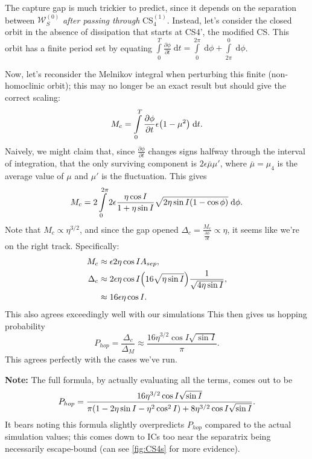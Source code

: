\documentclass[11pt,
        usenames, %
        dvipsnames %
    ]{article}
\newcommand*{\pd}[2]{\frac{\partial#1}{\partial#2}}
\DeclarePairedDelimiter\p{\lparen}{\rparen}
\begin{document}
The capture gap is much trickier to predict, since it depends on the separation
between $\mathcal{W}^{(0)}_S$ \emph{after passing through} CS$_4^{(1)}$.
Instead, let's consider the closed orbit in the absence of dissipation that
starts at CS4', the modified CS\@. This orbit has a finite period set by
equating $\int\limits_0^T \pd{\phi}{t}\;\mathrm{d}t =
\int\limits_0^{2\pi}\;\mathrm{d}\phi + \int\limits_{2\pi}^0\;\mathrm{d}\phi$.

Now, let's reconsider the Melnikov integral when perturbing this finite
(non-homoclinic orbit); this may no longer be an exact result but should give
the correct scaling:
\begin{equation}
    M_c = \int\limits_0^T \pd{\phi}{t}\epsilon \p*{1 - \mu^2}\;\mathrm{d}t.
\end{equation}
Naively, we might claim that, since $\pd{\phi}{t}$ changes signs halfway through
the interval of integration, that the only surviving component is $2\epsilon
\bar{\mu}\mu'$, where $\bar{\mu} = \mu_4$ is the average value of $\mu$ and
$\mu'$ is the fluctuation. This gives
\begin{equation}
    M_c = 2\int\limits_0^{2\pi}2\epsilon \frac{\eta \cos I}{1 + \eta \sin I}
        \sqrt{2\eta \sin I \p*{1 - \cos \phi}}\;\mathrm{d}\phi.
\end{equation}
Note that $M_c \propto \eta^{3/2}$, and since the gap opened $\Delta_c =
\frac{M_c}{\pd{\phi}{t}} \propto \eta$, it seems like we're on the right track.
Specifically:
\begin{align}
    M_c &\approx \epsilon 2\eta \cos I A_{sep},\\
    \Delta_c &\approx 2\epsilon \eta \cos I \p*{16 \sqrt{\eta \sin I}}
        \frac{1}{\sqrt{4\eta \sin I}},\\
        &\approx 16\epsilon \eta \cos I.
\end{align}
This also agrees exceedingly well with our simulations This then gives us
hopping probability
\begin{equation}
    P_{hop} = \frac{\Delta_c}{\Delta_M} \approx
        \frac{16\eta^{3/2}\cos I \sqrt{\sin I}}{\pi}.
\end{equation}
This agrees perfectly with the cases we've run.

\textbf{Note:} The full formula, by actually evaluating all the terms, comes out
to be
\begin{equation}
    P_{hop} = \frac{16\eta^{3/2}\cos I \sqrt{\sin I}}{\pi
        \p*{1 - 2\eta \sin I - \eta^2 \cos^2 I}
        + 8\eta^{3/2}\cos I \sqrt{\sin I}}.
\end{equation}
It bears noting this formula slightly overpredicts $P_{hop}$ compared to the
actual simulation values; this comes down to ICs too near the separatrix being
necessarily escape-bound (can see \autoref{fig:CS4s} for more evidence).
\end{document}
